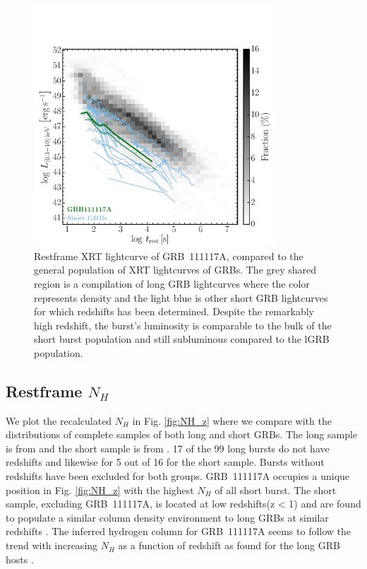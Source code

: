 \documentclass{aa}    %
\begin{document}
\begin{figure}
	\centering
	\includegraphics[width=9cm]{figures/XLC_111117A_rest.pdf}
	\caption{Restframe XRT lightcurve of GRB~111117A, compared to the general population of XRT lightcurves of GRBs. The grey shared region is a compilation of long GRB lightcurves where the color represents density and the light blue is other short GRB lightcurves for which redshifts has been determined. Despite the remarkably high redshift, the burst’s luminosity is comparable to the bulk of the short burst population and still subluminous compared to the lGRB population.}
	\label{fig:sxray_lightcurve}
\end{figure}




\subsection{Restframe $N_H$}

We plot the recalculated $N_H$ in Fig. \ref{fig:NH_z} where we compare with the distributions of complete samples of both long and short GRBs. The long sample is from \citet{Arcodia2016} and the short sample is from \citet{DAvanzo2014a}. 17 of the 99 long bursts do not have redshifts and likewise for 5 out of 16 for the short sample. Bursts without redshifts have been excluded for both groups. GRB~111117A occupies a unique position in Fig. \ref{fig:NH_z} with the highest $N_H$ of all short burst. The short sample, excluding GRB~111117A, is located at low redshifts(z < 1) and are found to populate a similar column density environment to long GRBs at similar redshifts \citep{DAvanzo2014a}. The inferred hydrogen column for GRB~111117A seems to follow the trend with increasing $N_H$ as a function of redshift as found for the long GRB hosts \citep{Arcodia2016}.   
\end{document}
